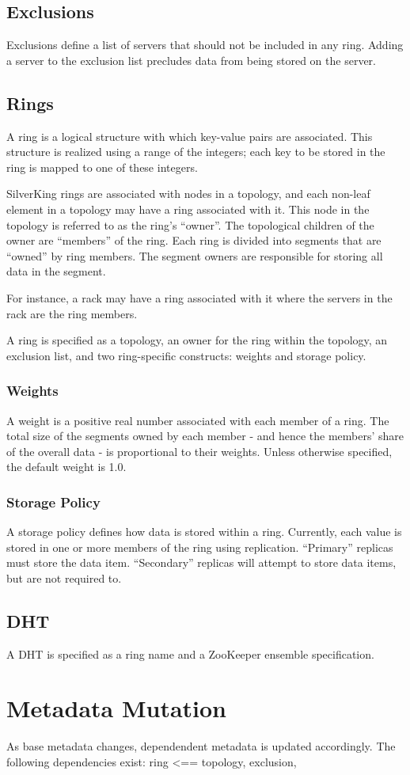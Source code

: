 \subsection{Exclusions}

Exclusions define a list of servers that should not be included in any ring. Adding a server to the exclusion list precludes data from being stored on the server.

\subsection{Rings}

A ring is a logical structure with which key-value pairs are associated. This structure is realized using a range of the integers; each key to be stored in the ring is mapped to one of these integers. 

SilverKing rings are associated with nodes in a topology, and
each non-leaf element in a topology may have a ring associated with it. This node in the topology is referred to as the ring's ``owner''. The topological children of the owner are ``members'' of the ring. Each ring is divided into segments that are ``owned'' by ring members. The segment owners are responsible for storing all data in the segment.

For instance, a rack may have a ring associated with it where the servers in the rack are the ring members.

A ring is specified as a topology, an owner for the ring within the topology, an exclusion list, and two ring-specific constructs: weights and storage policy.

\subsubsection{Weights}

A weight is a positive real number associated with each member of a ring. The total size of the segments owned by each member - and hence the members' share of the overall data - is proportional to their weights. Unless otherwise specified, the default weight is 1.0.

\subsubsection{Storage Policy}

A storage policy defines how data is stored within a ring. Currently, each value is stored in one or more members of the ring using replication. ``Primary'' replicas must store the data item. ``Secondary'' replicas will attempt to store data items, but are not required to.

\subsection{DHT}

A DHT is specified as a ring name and a ZooKeeper ensemble specification.



\section{Metadata Mutation}

As base metadata changes, dependendent metadata is updated accordingly. The following dependencies exist:
	ring <== topology, exclusion, 